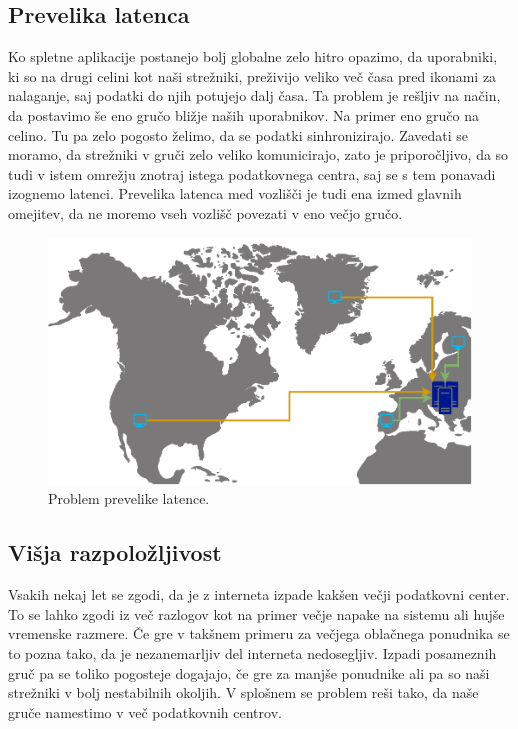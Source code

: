 \documentclass[a4paper, 12pt]{book}
\begin{document}
\subsection{Prevelika latenca}
Ko spletne aplikacije postanejo bolj globalne zelo hitro opazimo, da uporabniki, ki so na drugi celini kot naši strežniki, preživijo veliko več časa pred ikonami za nalaganje, saj podatki do njih potujejo dalj časa.
Ta problem je rešljiv na način, da postavimo še eno gručo bližje naših uporabnikov.
Na primer eno gručo na celino.
Tu pa zelo pogosto želimo, da se podatki sinhronizirajo.
Zavedati se moramo, da strežniki v gruči zelo veliko komunicirajo, zato je priporočljivo, da so tudi v istem omrežju znotraj istega podatkovnega centra, saj se s tem ponavadi izognemo latenci. 
Prevelika latenca med vozlišči je tudi ena izmed glavnih omejitev, da ne moremo vseh vozlišč povezati v eno večjo gručo.
\begin{figure}[h]
\begin{center}
  \includegraphics[width=1.0\textwidth]{images/problem-prevelike-latence.pdf}
\end{center}
\caption{Problem prevelike latence.}
\label{problem-prevelike-latence}
\end{figure}
\subsection{Višja razpoložljivost}
Vsakih nekaj let se zgodi, da je z interneta izpade kakšen večji podatkovni center. 
To se lahko zgodi iz več razlogov kot na primer večje napake na sistemu ali hujše vremenske razmere.
Če gre v takšnem primeru za večjega oblačnega ponudnika se to pozna tako, da je nezanemarljiv del interneta nedosegljiv.
Izpadi posameznih gruč pa se toliko pogosteje dogajajo, če gre za manjše ponudnike ali pa so naši strežniki v bolj nestabilnih okoljih. 
V splošnem se problem reši tako, da naše gruče namestimo v več podatkovnih centrov.
\end{document}
